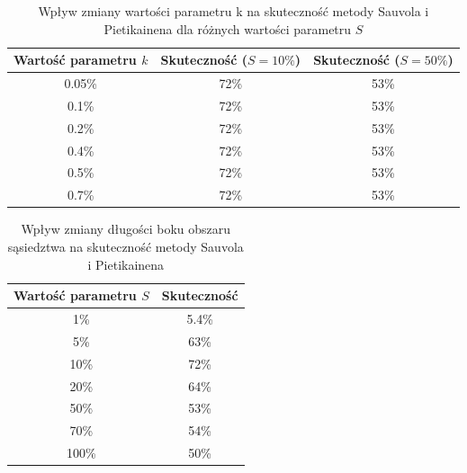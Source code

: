 \begin {table}[H]
  \begin{center}
    \begin{tabular}{c | c | c}
      Wartość parametru $k$ & Skuteczność ($S = 10\%$) & Skuteczność ($S = 50\%$)  \\
      \hline
      0.05\% & 72\% & 53\% \\
      0.1\% & 72\% & 53\% \\
      0.2\% & 72\% & 53\% \\
      0.4\% & 72\% & 53\% \\
      0.5\% & 72\% & 53\% \\
      0.7\% & 72\% & 53\%
    \end{tabular}
    \caption {Wpływ zmiany wartości parametru k na skuteczność metody Sauvola i Pietikainena dla różnych wartości parametru $S$}
    \label{tab:sauvol_pietikainen_parametr_k} 
  \end{center}
\end {table}

\begin {table}[H]
  \begin{center}
    \begin{tabular}{c | c}
      Wartość parametru $S$ & Skuteczność \\
      \hline
      1\% & 5.4\% \\
      5\% & 63\% \\
      10\% & 72\% \\
      20\% & 64\% \\
      50\% & 53\% \\
      70\% & 54\% \\
      100\% & 50\%
    \end{tabular}
    \caption {Wpływ zmiany długości boku obszaru sąsiedztwa na skuteczność metody Sauvola i Pietikainena}
    \label{tab:sauvol_pietikainen_dlugosc_boku} 
  \end{center}
\end {table}

